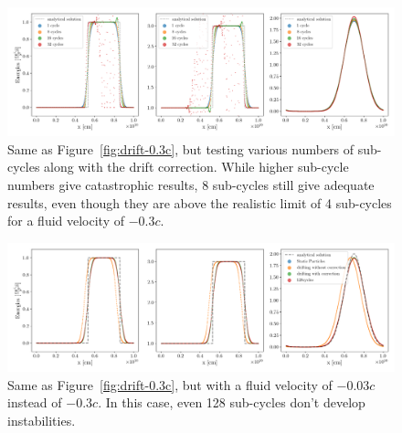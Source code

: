 \begin{figure}
 \centering
 \includegraphics[width=\textwidth]{figures/RHD/drift/0.3c-subcycles.png}%
 \caption{
Same as Figure~\ref{fig:drift-0.3c}, but testing various numbers of sub-cycles along with the drift
correction. While higher sub-cycle numbers give catastrophic results, 8 sub-cycles still give
adequate results, even though they are above the realistic limit of 4 sub-cycles for a fluid
velocity of $-0.3c$.
 }
 \label{fig:drift-0.3c-subcycles}
\end{figure}




\begin{figure}
 \centering
 \includegraphics[width=\textwidth]{figures/RHD/drift/0.03c-128cycles.png}%
 \caption{
Same as Figure~\ref{fig:drift-0.3c}, but with a fluid velocity of $-0.03c$ instead of $-0.3c$. In
this case, even 128 sub-cycles don't develop instabilities.
 }
 \label{fig:drift-0.03c-subcycles}
\end{figure}



